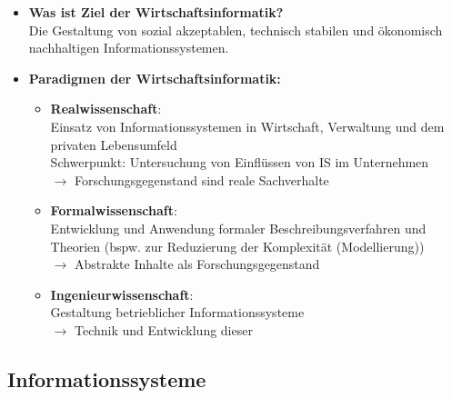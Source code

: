 \documentclass[12pt,a4paper]{article}
\begin{document}
\begin{itemize}
   \item \textbf{Was ist Ziel der Wirtschaftsinformatik?}\\
         Die Gestaltung von sozial akzeptablen, technisch stabilen und ökonomisch nachhaltigen Informationssystemen.
   
   \item \textbf{Paradigmen der Wirtschaftsinformatik:}
   \begin{itemize}
      \item \textbf{Realwissenschaft}: \\
            Einsatz von Informationssystemen in Wirtschaft, Verwaltung und dem privaten Lebensumfeld\\
            Schwerpunkt: Untersuchung von Einflüssen von IS im Unternehmen\\
            $\rightarrow$ Forschungsgegenstand sind reale Sachverhalte
      \item \textbf{Formalwissenschaft}: \\
            Entwicklung und Anwendung formaler Beschreibungsverfahren und Theorien 
            (bspw. zur Reduzierung der Komplexität (Modellierung))\\
            $\rightarrow$ Abstrakte Inhalte als Forschungsgegenstand
      \item \textbf{Ingenieurwissenschaft}: \\
            Gestaltung betrieblicher Informationssysteme\\
            $\rightarrow$ Technik und Entwicklung dieser
   \end{itemize}
\end{itemize}
 

\subsection{Informationssysteme} %
\end{document}
